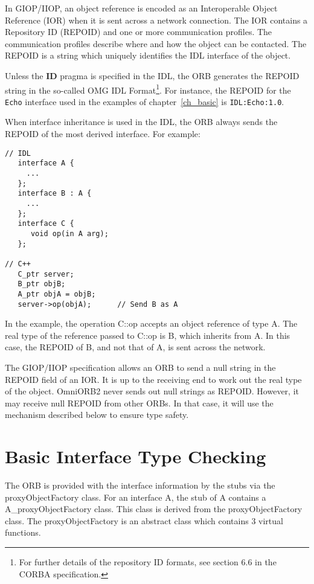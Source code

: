 \documentclass[11pt,twoside,onecolumn]{book}
\begin{document}
In GIOP/IIOP, an object reference is encoded as an Interoperable Object
Reference (IOR) when it is sent across a network connection. The IOR
contains a Repository ID (REPOID) and one or more communication profiles. The
communication profiles describe where and how the object can be
contacted. The REPOID is a string which uniquely identifies the
IDL interface of the object. 

Unless the {\bf ID} pragma is specified in the IDL, the ORB generates the
REPOID string in the so-called OMG IDL Format\footnote{For further details
of the repository ID formats, see section 6.6 in the CORBA
specification.}. For instance, the REPOID for the {\tt Echo} interface used
in the examples of chapter~\ref{ch_basic} is {\tt IDL:Echo:1.0}.

When interface inheritance is used in the IDL, the ORB always sends the
REPOID of the most derived interface. For example:

{\small
\begin{verbatim}
// IDL
   interface A {
     ...
   };
   interface B : A {
     ...
   };
   interface C {
      void op(in A arg);
   };

// C++
   C_ptr server;
   B_ptr objB;
   A_ptr objA = objB;
   server->op(objA);      // Send B as A
\end{verbatim}
}

In the example, the operation C::op accepts an object reference of type
A. The real type of the reference passed to C::op is B, which inherits from
A. In this case, the REPOID of B, and not that of A, is sent across the
network.

The GIOP/IIOP specification allows an ORB to send a null string in the
REPOID field of an IOR. It is up to the receiving end to work out the real
type of the object. OmniORB2 never sends out null strings as
REPOID. However, it may receive null REPOID from other ORBs. In that case,
it will use the mechanism described below to ensure type safety.

\section{Basic Interface Type Checking}
\label{sec_intf}

The ORB is provided with the interface information by the stubs via the
proxyObjectFactory class. For an interface A, the stub of A contains a
A\_proxyObjectFactory class. This class is derived from the
proxyObjectFactory class. The proxyObjectFactory is an abstract class which
contains 3 virtual functions.
\end{document}
